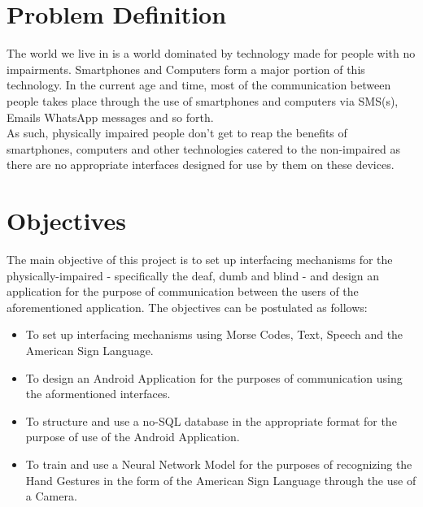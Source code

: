 \documentclass[14pt]{report}
\renewcommand{\headrulewidth}{2pt}
\renewcommand{\footrulewidth}{0.4pt}
\begin{document}
		\fancypagestyle{plain}{%
		\fancyhf{}%
		\fancyfoot[R]{Page \thepage}%
		\renewcommand{\headrulewidth}{0pt}%
		\renewcommand{\footrulewidth}{0.4pt}%
		}

		\section{Problem Definition}
			The world we live in is a world dominated by technology made for people with no impairments. Smartphones and Computers form a major portion of this technology. In the current age and time, most of the communication between people takes place through the use of smartphones and computers via SMS(s), Emails WhatsApp messages and so forth. \\
			
			As such, physically impaired people don't get to reap the benefits of smartphones, computers and other technologies catered to the non-impaired as there are no appropriate interfaces designed for use by them on these devices.
		
			\section{Objectives}
			The main objective of this project is to set up interfacing mechanisms for the physically-impaired - specifically the deaf, dumb and blind - and design an application for the purpose of communication between the users of the aforementioned application. The objectives can be postulated as follows:
			\begin{itemize}
				\item To set up interfacing mechanisms using Morse Codes, Text, Speech and the American Sign Language. 
				\item To design an Android Application for the purposes of communication using the aformentioned interfaces.
				\item To structure and use a no-SQL database in the appropriate format for the purpose of use of the Android Application.
				\item To train and use a Neural Network Model for the purposes of recognizing the Hand Gestures in the form of the American Sign Language through the use of a Camera.
			\end{itemize}
\end{document}
